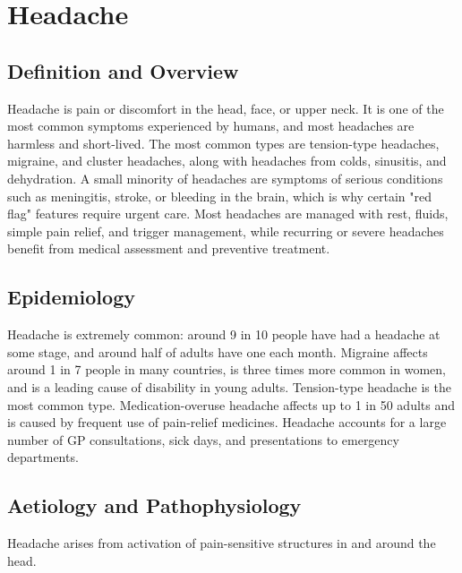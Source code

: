 \chapter{Headache}

\section*{Definition and Overview}
Headache is pain or discomfort in the head, face, or upper neck. It is one of the most common symptoms experienced by humans, and most headaches are harmless and short-lived. The most common types are tension-type headaches, migraine, and cluster headaches, along with headaches from colds, sinusitis, and dehydration. A small minority of headaches are symptoms of serious conditions such as meningitis, stroke, or bleeding in the brain, which is why certain "red flag" features require urgent care. Most headaches are managed with rest, fluids, simple pain relief, and trigger management, while recurring or severe headaches benefit from medical assessment and preventive treatment.

\section*{Epidemiology}
Headache is extremely common: around 9 in 10 people have had a headache at some stage, and around half of adults have one each month. Migraine affects around 1 in 7 people in many countries, is three times more common in women, and is a leading cause of disability in young adults. Tension-type headache is the most common type. Medication-overuse headache affects up to 1 in 50 adults and is caused by frequent use of pain-relief medicines. Headache accounts for a large number of GP consultations, sick days, and presentations to emergency departments.

\section*{Aetiology and Pathophysiology}
Headache arises from activation of pain-sensitive structures in and around the head.

